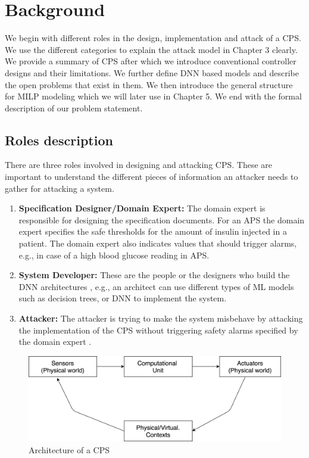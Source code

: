 \chapter{Background}
\label{ch:Chapter2}

We begin with different roles in the design, implementation and attack of a \ac{CPS}. We use the different categories to explain the attack model in Chapter 3 clearly. 
We provide a summary of \ac{CPS} after which we introduce conventional controller designs and their limitations. 
We further define \ac{DNN} based models and describe the open problems that exist in them. 
We then introduce the  general structure for \ac{MILP} modeling which we will later use in Chapter 5. 
We end with the formal description of our problem statement.

\section{Roles description}
There are three roles involved in designing and attacking \ac{CPS}. These are important to understand the different pieces of information an attacker needs to gather for attacking a system.

\begin{enumerate}
	\item \textbf{Specification Designer/Domain Expert:} The domain expert is responsible for designing the specification documents. 
	For an \ac{APS} the domain expert specifies the safe thresholds for the amount of insulin injected in a patient. The domain expert also indicates values that should trigger alarms, e.g., in case of a high blood glucose reading in \ac{APS}.
	\item \textbf{System Developer:} These are the people or the designers who
	build the \ac{DNN} architectures , e.g., an architect can use different types of \ac{ML} models such as decision trees, or \ac{DNN} to implement the system.
	\item \textbf{Attacker:} The attacker is trying to make the system misbehave by attacking the implementation of the \ac{CPS} without triggering safety alarms specified by the domain expert . 
\end{enumerate}

\begin{figure}
	\centering
	\includegraphics[width=0.7\linewidth]{Images/Systemsdescription}
	\caption{Architecture of a CPS}
	\label{fig:systemsdescription}
\end{figure}

